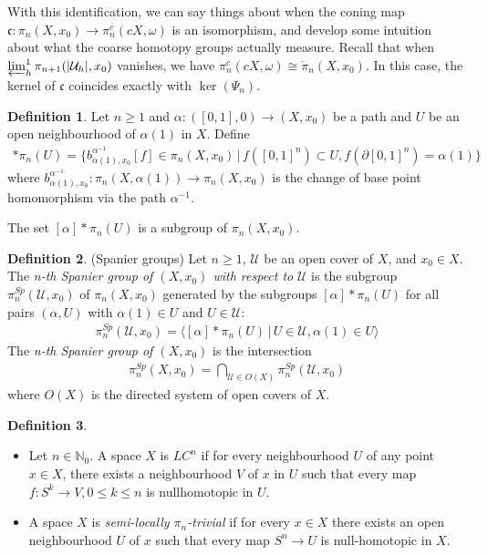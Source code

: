 \documentclass[a4paper,11pt]{article}
\theoremstyle{definition}
\newtheorem{definition}{Definition}[section]
\theoremstyle{plain}
\theoremstyle{remark}
\begin{document}
{With this identification, we can say things about when the coning map $\mathfrak{c}:\pi_{n}(X,x_0)\rightarrow \pi_{n}^{c}(cX,\omega)$  is an isomorphism, and develop some intuition about what the coarse homotopy groups actually measure. Recall that when $\varprojlim_h^1\pi_{n+1}(|\mathcal{U}_{h}|,x_0)$ vanishes, we have $\pi_{n}^{c}(cX,\omega) \cong \check{\pi}_{n}(X,x_0)$. In this case, the kernel of $\mathfrak{c}$ coincides exactly with $\ker(\Psi_n)$. 

\begin{definition} Let $n\geq 1$ and $\alpha: ([0,1],0)\rightarrow (X,x_0)$ be a path and $U$ be an open neighbourhood of $\alpha(1)$ in $X$. Define
\begin{align*}
[\alpha] \ast \pi_{n}(U) = \{b^{\alpha^{-1}}_{\alpha(1),x_0}[f]\in \pi_{n}(X,x_0) \,|\, f([0,1]^n)\subset U, f(\partial [0,1]^n) = \alpha(1)\}
\end{align*}
where $b^{\alpha^{-1}}_{\alpha(1),x_0}: \pi_{n}(X,\alpha(1))\rightarrow \pi_{n}(X,x_0)$ is the change of base point homomorphism via the path $\alpha^{-1}$. 
\end{definition}
The set $[\alpha] \ast \pi_{n}(U)$ is a subgroup of $\pi_{n}(X,x_0)$. 

\begin{definition} (Spanier groups) Let $n\geq 1$, $\mathcal{U}$ be an open cover of $X$, and $x_0\in X$. The \textit{n-th Spanier group of $(X,x_0)$ with respect to} $\mathcal{U}$ is the subgroup $\pi_{n}^{Sp}(\mathcal{U},x_0)$ of $\pi_{n}(X,x_0)$ generated by the subgroups $[\alpha] \ast \pi_{n}(U)$ for all pairs $(\alpha,U)$ with $\alpha(1) \in U$ and $U\in \mathcal{U}$:
\begin{align*}
\pi_{n}^{Sp}(\mathcal{U},x_0) = \langle [\alpha] \ast \pi_{n}(U)\,|\, U\in \mathcal{U}, \alpha(1)\in U \rangle 
\end{align*}
The \textit{n-th Spanier group of $(X,x_0)$} is the intersection
\begin{align*}
\pi_{n}^{Sp}(X,x_0) = \bigcap_{\mathcal{U}\in O(X)} \pi_{n}^{Sp}(\mathcal{U},x_0)
\end{align*}
where $O(X)$ is the directed system of open covers of $X$. 
\end{definition}


\begin{definition} \begin{itemize}
\item Let $n\in \mathbb{N}_{0}$. A space $X$ is $LC^n$ if for every neighbourhood $U$ of any point $x\in X$, there exists a neighbourhood $V$ of $x$ in $U$ such that every map $f: S^{k}\rightarrow V, 0\leq k \leq n$ is nullhomotopic in $U$. 
\item A space $X$ is \textit{semi-locally $\pi_{n}$-trivial} if for every $x\in X$ there exists an open neighbourhood $U$ of $x$ such that every map $S^n\rightarrow U$ is null-homotopic in $X$. 
\end{itemize}
\end{definition}

}
\end{document}
